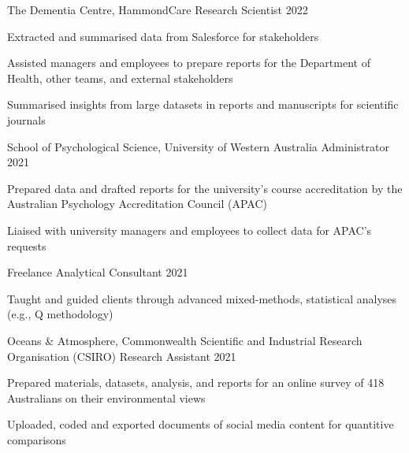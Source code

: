 \begin{cventries}
  \cventry
    {The Dementia Centre, HammondCare} %
    {Research Scientist} %
    {}%
    {2022} %
    { %
      \begin{cvitems}
        \item Extracted and summarised data from Salesforce for stakeholders
         \item Assisted managers and employees to prepare reports for the Department of Health, other teams, and external stakeholders
         \item Summarised insights from large datasets in reports and manuscripts for scientific journals  
      \end{cvitems}
    }

  \cventry
    {School of Psychological Science, University of Western Australia} %
    {Administrator} %
    {}%
    {2021} %
    { %
      \begin{cvitems}
        \item Prepared data and drafted reports for the university's course accreditation by the Australian Psychology Accreditation Council (APAC)
        \item Liaised with university managers and employees to collect data for APAC's requests
      \end{cvitems}
    }

  \cventry
    {Freelance} %
    {Analytical Consultant} %
    {}%
    {2021} %
    { %
      \begin{cvitems}
        \item Taught and guided clients through advanced mixed-methods, statistical analyses (e.g., Q methodology)
      \end{cvitems}
    }
    
  \cventry
    {Oceans \& Atmosphere, Commonwealth Scientific and Industrial Research Organisation (CSIRO)} %
    {Research Assistant} %
    {}%
    {2021} %
    { %
      \begin{cvitems}
        \item Prepared materials, datasets, analysis, and reports for an online survey of 418 Australians on their environmental views
        \item Uploaded, coded and exported documents of social media content for quantitive comparisons
      \end{cvitems}
    }


\end{cventries}
